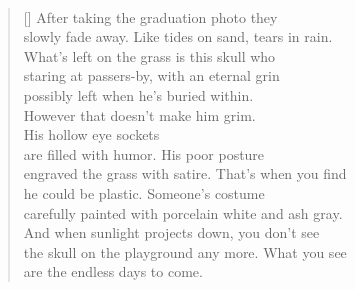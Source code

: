 \documentclass{book}
\begin{document}
\newpage
\poemtitle{\textcolor[RGB]{165,15,15}{The skull on the playground}}
\hspace*{\fill} \\
\settowidth{\versewidth}{engraved the grass with satire. That's when you find}
\begin{verse}[\versewidth]
    After taking the graduation photo they\\
    slowly fade away. Like tides on sand, tears in rain.\\
    What's left on the grass is this skull who\\
    staring at passers-by, with an eternal grin\\
    possibly left when he's buried within. \\
    However that doesn't make him grim. \\
    His hollow eye sockets\\
    are filled with humor. His poor posture \\
    engraved the grass with satire. That's when you find\\
    he could be plastic. Someone's costume\\
    carefully painted with porcelain white and ash gray.\\
    And when sunlight projects down, you don't see\\
    the skull on the playground any more. What you see\\
    are the endless days to come.\\
\end{verse}
\end{document}
